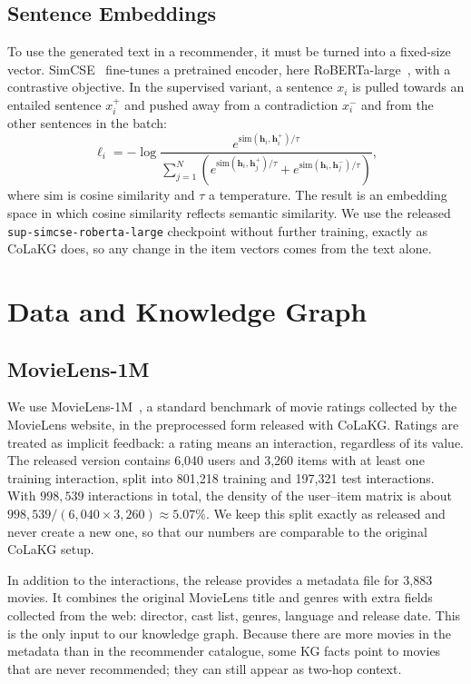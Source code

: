 \documentclass[a4paper,11pt]{article}
\begin{document}
\subsection{Sentence Embeddings}
To use the generated text in a recommender, it must be turned into a fixed-size vector. SimCSE~\cite{gao2021simcse} fine-tunes a pretrained encoder, here RoBERTa-large~\cite{liu2019roberta}, with a contrastive objective. In the supervised variant, a sentence $x_i$ is pulled towards an entailed sentence $x_i^{+}$ and pushed away from a contradiction $x_i^{-}$ and from the other sentences in the batch:
\begin{equation}
\label{eq:simcse}
\ell_i = -\log \frac{e^{\mathrm{sim}(\mathbf{h}_i,\mathbf{h}_i^{+})/\tau}}{\sum_{j=1}^{N}\left(e^{\mathrm{sim}(\mathbf{h}_i,\mathbf{h}_j^{+})/\tau}+e^{\mathrm{sim}(\mathbf{h}_i,\mathbf{h}_j^{-})/\tau}\right)},
\end{equation}
where $\mathrm{sim}$ is cosine similarity and $\tau$ a temperature. The result is an embedding space in which cosine similarity reflects semantic similarity. We use the released \texttt{sup-simcse-roberta-large} checkpoint without further training, exactly as CoLaKG does, so any change in the item vectors comes from the text alone.

\section{Data and Knowledge Graph}
\label{sec:data}
\subsection{MovieLens-1M}
We use MovieLens-1M~\cite{harper2015movielens}, a standard benchmark of movie ratings collected by the MovieLens website, in the preprocessed form released with CoLaKG. Ratings are treated as implicit feedback: a rating means an interaction, regardless of its value. The released version contains 6,040 users and 3,260 items with at least one training interaction, split into 801,218 training and 197,321 test interactions. With $998{,}539$ interactions in total, the density of the user--item matrix is about $998{,}539/(6{,}040\times3{,}260)\approx5.07\%$. We keep this split exactly as released and never create a new one, so that our numbers are comparable to the original CoLaKG setup.

In addition to the interactions, the release provides a metadata file for 3,883 movies. It combines the original MovieLens title and genres with extra fields collected from the web: director, cast list, genres, language and release date. This is the only input to our knowledge graph. Because there are more movies in the metadata than in the recommender catalogue, some KG facts point to movies that are never recommended; they can still appear as two-hop context.
\end{document}
